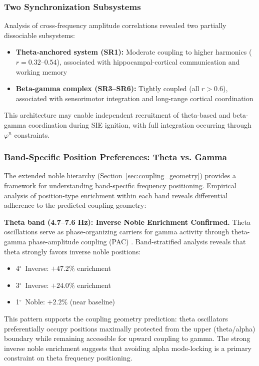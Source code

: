 \documentclass[11pt,a4paper]{article}
\newcommand{\degree}{$^\circ$}  %
\newcommand{\phisym}{\varphi}
\begin{document}
\subsubsection{Two Synchronization Subsystems}
Analysis of cross-frequency amplitude correlations revealed two partially dissociable subsystems:
\begin{itemize}
    \item \textbf{Theta-anchored system (SR1):} Moderate coupling to higher harmonics ($r = 0.32$--$0.54$), associated with hippocampal-cortical communication and working memory \parencite{hyman2005medial}
    \item \textbf{Beta-gamma complex (SR3--SR6):} Tightly coupled (all $r > 0.6$), associated with sensorimotor integration and long-range cortical coordination \parencite{engel2010beta}
\end{itemize}

This architecture may enable independent recruitment of theta-based and beta-gamma coordination during SIE ignition, with full integration occurring through $\phisym^n$ constraints.

\subsubsection{Band-Specific Position Preferences: Theta vs. Gamma}
\label{sec:theta_gamma_inverse}

The extended noble hierarchy (Section~\ref{sec:coupling_geometry}) provides a framework for understanding band-specific frequency positioning. Empirical analysis of position-type enrichment within each band reveals differential adherence to the predicted coupling geometry:

\textbf{Theta band (4.7--7.6 Hz): Inverse Noble Enrichment Confirmed.}
Theta oscillations serve as phase-organizing carriers for gamma activity through theta-gamma phase-amplitude coupling (PAC) \parencite{lisman2013thetagamma}. Band-stratified analysis reveals that theta strongly favors inverse noble positions:
\begin{itemize}
    \item 4\degree\ Inverse: $+47.2\%$ enrichment
    \item 3\degree\ Inverse: $+24.0\%$ enrichment
    \item 1\degree\ Noble: $+2.2\%$ (near baseline)
\end{itemize}

This pattern supports the coupling geometry prediction: theta oscillators preferentially occupy positions maximally protected from the upper (theta/alpha) boundary while remaining accessible for upward coupling to gamma. The strong inverse noble enrichment suggests that avoiding alpha mode-locking is a primary constraint on theta frequency positioning.
\end{document}
